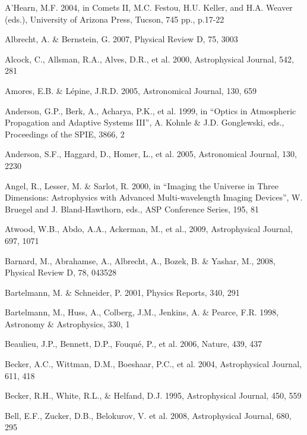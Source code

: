 \documentclass{emulateapj}
\begin{document}
\vskip 0.3in
\begin{thebibliography}{}

\bibitem[()]{} A'Hearn, M.F. 2004, in Comets II, M.C. Festou, H.U. Keller, and H.A. Weaver (eds.), 
             University of  Arizona Press, Tucson, 745 pp., p.17-22 

\bibitem[()]{} Albrecht, A. \& Bernstein, G. 2007, Physical Review D, 75, 3003

\bibitem[()]{} Alcock, C., Allsman, R.A., Alves, D.R., et al. 2000, Astrophysical Journal, 542, 281  

\bibitem[()]{} Amores, E.B. \& L\'{e}pine, J.R.D. 2005, Astronomical Journal, 130, 659

\bibitem[()]{} Anderson, G.P., Berk, A., Acharya, P.K., et al. 1999, in ``Optics in
             Atmospheric Propagation and Adaptive Systems III'',  A. Kohnle \& J.D. Gonglewski,
             eds., Proceedings of the SPIE, 3866, 2

\bibitem[()]{} Anderson, S.F., Haggard, D., Homer, L., et al. 2005, Astronomical Journal, 130, 2230

\bibitem[()]{} Angel, R., Lesser, M. \& Sarlot, R. 2000, in  ``Imaging the Universe in Three 
             Dimensions: Astrophysics with Advanced Multi-wavelength Imaging Devices'',
             W. Bruegel and J. Bland-Hawthorn, eds., ASP Conference Series, 195, 81

\bibitem[()]{} Atwood, W.B., Abdo, A.A., Ackerman, M., et al., 2009, Astrophysical Journal, 697, 1071

\bibitem[()]{} Barnard, M., Abrahamse, A., Albrecht, A., Bozek, B. \& Yashar, M., 2008, Physical Review D, 78, 043528

\bibitem[()]{} Bartelmann, M. \& Schneider, P. 2001, Physics Reports, 340, 291
	
\bibitem[()]{} Bartelmann, M., Huss, A., Colberg, J.M., Jenkins, A. \& Pearce, F.R. 1998, Astronomy \& 
             Astrophysics, 330, 1

\bibitem[()]{} Beaulieu, J.P., Bennett, D.P., Fouqu\'{e}, P., et al. 2006, Nature, 439, 437

\bibitem[()]{} Becker, A.C., Wittman, D.M., Boeshaar, P.C., et al. 2004, Astrophysical Journal, 611, 418

\bibitem[()]{} Becker, R.H., White, R.L., \& Helfand, D.J. 1995, Astrophysical Journal, 450, 559

\bibitem[()]{} Bell, E.F., Zucker, D.B., Belokurov, V. et al. 2008, Astrophysical Journal, 680, 295
	

\end{thebibliography}
\end{document}
